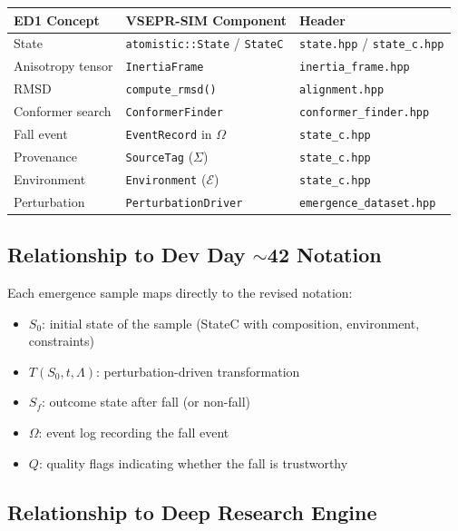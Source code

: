 \documentclass[11pt]{article}
\begin{document}
\begin{center}
\begin{tabular}{lll}
\toprule
\textbf{ED1 Concept} & \textbf{VSEPR-SIM Component} & \textbf{Header} \\
\midrule
State & \texttt{atomistic::State} / \texttt{StateC} & \texttt{state.hpp} / \texttt{state\_c.hpp} \\
Anisotropy tensor & \texttt{InertiaFrame} & \texttt{inertia\_frame.hpp} \\
RMSD & \texttt{compute\_rmsd()} & \texttt{alignment.hpp} \\
Conformer search & \texttt{ConformerFinder} & \texttt{conformer\_finder.hpp} \\
Fall event & \texttt{EventRecord} in $\Omega$ & \texttt{state\_c.hpp} \\
Provenance & \texttt{SourceTag} ($\Sigma$) & \texttt{state\_c.hpp} \\
Environment & \texttt{Environment} ($\mathcal{E}$) & \texttt{state\_c.hpp} \\
Perturbation & \texttt{PerturbationDriver} & \texttt{emergence\_dataset.hpp} \\
\bottomrule
\end{tabular}
\end{center}

\subsection{Relationship to Dev Day $\sim$42 Notation}

Each emergence sample maps directly to the revised notation:
\begin{itemize}
  \item \textbf{$S_0$}: initial state of the sample (StateC with composition, environment, constraints)
  \item \textbf{$T(S_0, t, \Lambda)$}: perturbation-driven transformation
  \item \textbf{$S_f$}: outcome state after fall (or non-fall)
  \item \textbf{$\Omega$}: event log recording the fall event
  \item \textbf{$Q$}: quality flags indicating whether the fall is trustworthy
\end{itemize}

\subsection{Relationship to Deep Research Engine}
\end{document}
